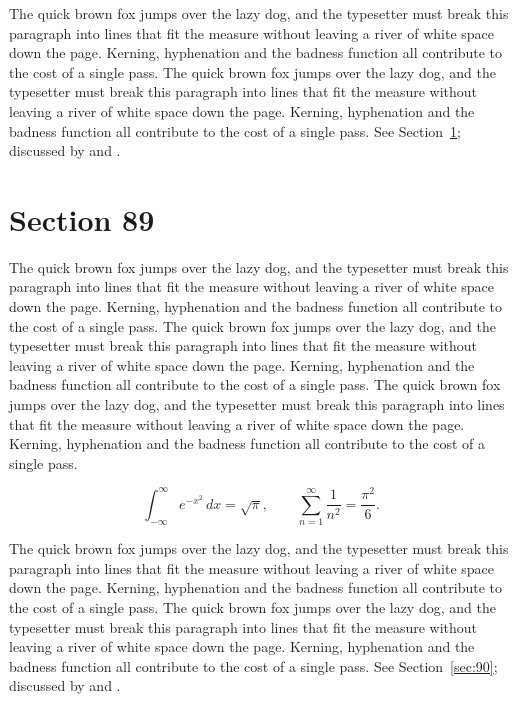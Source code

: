 \documentclass{article}
\begin{document}
The quick brown fox jumps over the lazy dog, and the typesetter must break this paragraph into lines that fit the measure without leaving a river of white space down the page. Kerning, hyphenation and the badness function all contribute to the cost of a single pass. The quick brown fox jumps over the lazy dog, and the typesetter must break this paragraph into lines that fit the measure without leaving a river of white space down the page. Kerning, hyphenation and the badness function all contribute to the cost of a single pass. 
See Section~\ref{sec:89}; discussed by \textcite{k4} and \textcite{l1}.
\section{Section 89}
\label{sec:89}
The quick brown fox jumps over the lazy dog, and the typesetter must break this paragraph into lines that fit the measure without leaving a river of white space down the page. Kerning, hyphenation and the badness function all contribute to the cost of a single pass. The quick brown fox jumps over the lazy dog, and the typesetter must break this paragraph into lines that fit the measure without leaving a river of white space down the page. Kerning, hyphenation and the badness function all contribute to the cost of a single pass. The quick brown fox jumps over the lazy dog, and the typesetter must break this paragraph into lines that fit the measure without leaving a river of white space down the page. Kerning, hyphenation and the badness function all contribute to the cost of a single pass. 

\begin{equation}\label{eq:89}
\int_{-\infty}^{\infty} e^{-x^{2}}\,dx = \sqrt{\pi}, \qquad
\sum_{n=1}^{\infty} \frac{1}{n^{2}} = \frac{\pi^{2}}{6}.
\end{equation}

The quick brown fox jumps over the lazy dog, and the typesetter must break this paragraph into lines that fit the measure without leaving a river of white space down the page. Kerning, hyphenation and the badness function all contribute to the cost of a single pass. The quick brown fox jumps over the lazy dog, and the typesetter must break this paragraph into lines that fit the measure without leaving a river of white space down the page. Kerning, hyphenation and the badness function all contribute to the cost of a single pass. 
See Section~\ref{sec:90}; discussed by \textcite{k5} and \textcite{l2}.
\end{document}
